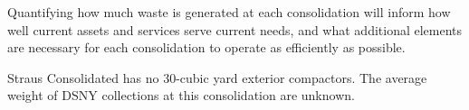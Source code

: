 
    Quantifying how much waste is generated at each consolidation will inform how well current assets and services serve current needs, and what additional elements are necessary for each consolidation to operate as efficiently as possible.
    
    Straus Consolidated has no 30-cubic yard exterior compactors. The average weight of DSNY collections at this consolidation are unknown.